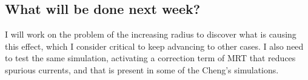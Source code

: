 \documentclass[12pt]{article}
\begin{document}
	\subsection*{What will be done next week?}
	I will work on the problem of the increasing radius to discover what is causing this effect, which I consider critical to keep advancing to other cases. I also need to test the same simulation, activating a correction term of MRT that reduces spurious currents, and that is present in some of the Cheng's simulations.

	\printbibliography %
\end{document}
